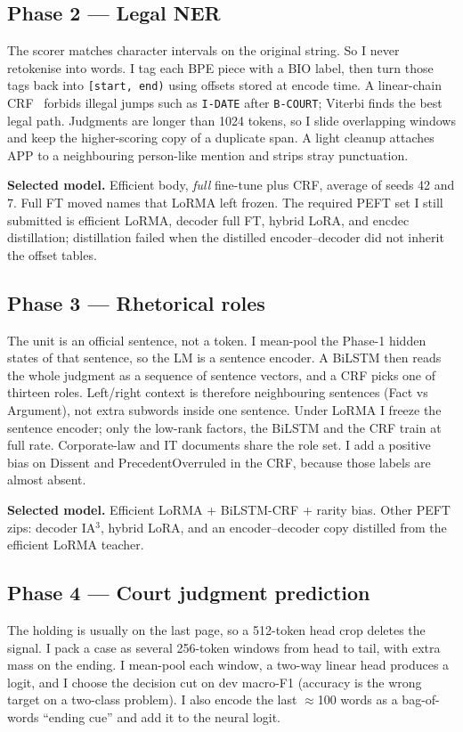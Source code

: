 \documentclass[11pt, oneside]{article}
\begin{document}
\subsection{Phase 2 --- Legal NER}
The scorer matches character intervals on the original string. So I never retokenise into words. I tag each BPE piece with a BIO label, then turn those tags back into \texttt{[start, end)} using offsets stored at encode time. A linear-chain CRF~\cite{lafferty2001crf} forbids illegal jumps such as \texttt{I-DATE} after \texttt{B-COURT}; Viterbi finds the best legal path. Judgments are longer than 1024 tokens, so I slide overlapping windows and keep the higher-scoring copy of a duplicate span. A light cleanup attaches APP to a neighbouring person-like mention and strips stray punctuation.

\textbf{Selected model.} Efficient body, \emph{full} fine-tune plus CRF, average of seeds 42 and 7. Full FT moved names that LoRMA left frozen. The required PEFT set I still submitted is efficient LoRMA, decoder full FT, hybrid LoRA, and encdec distillation; distillation failed when the distilled encoder--decoder did not inherit the offset tables.

\subsection{Phase 3 --- Rhetorical roles}
The unit is an official sentence, not a token. I mean-pool the Phase-1 hidden states of that sentence, so the LM is a sentence encoder. A BiLSTM then reads the whole judgment as a sequence of sentence vectors, and a CRF picks one of thirteen roles. Left/right context is therefore neighbouring sentences (Fact vs Argument), not extra subwords inside one sentence. Under LoRMA I freeze the sentence encoder; only the low-rank factors, the BiLSTM and the CRF train at full rate. Corporate-law and IT documents share the role set. I add a positive bias on Dissent and PrecedentOverruled in the CRF, because those labels are almost absent.

\textbf{Selected model.} Efficient LoRMA + BiLSTM-CRF + rarity bias. Other PEFT zips: decoder IA$^3$, hybrid LoRA, and an encoder--decoder copy distilled from the efficient LoRMA teacher.

\subsection{Phase 4 --- Court judgment prediction}
The holding is usually on the last page, so a 512-token head crop deletes the signal. I pack a case as several 256-token windows from head to tail, with extra mass on the ending. I mean-pool each window, a two-way linear head produces a logit, and I choose the decision cut on dev macro-F1 (accuracy is the wrong target on a two-class problem). I also encode the last $\approx$100 words as a bag-of-words ``ending cue'' and add it to the neural logit.
\end{document}
